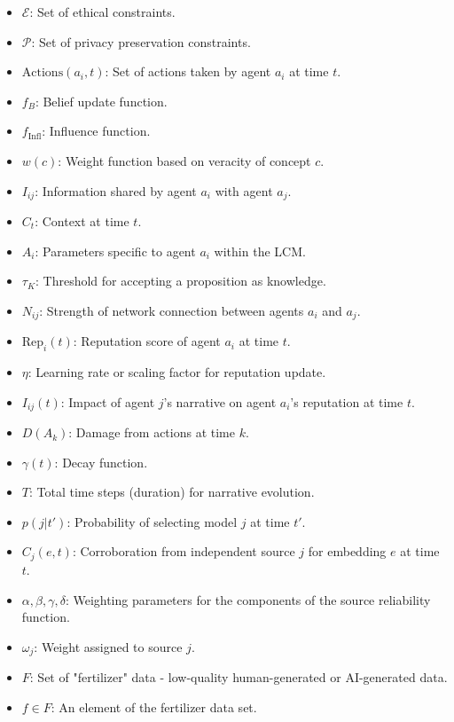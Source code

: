 \documentclass[12pt, a4paper]{article}
\begin{document}
\begin{itemize}
    \item \( \mathcal{E} \): Set of ethical constraints.
    \item \( \mathcal{P} \): Set of privacy preservation constraints.
    \item \( \text{Actions}(a_i, t) \): Set of actions taken by agent \( a_i \) at time \( t \).
    \item \( f_B \): Belief update function.
    \item \( f_{\text{Infl}} \): Influence function.
    \item \( w(c) \): Weight function based on veracity of concept \( c \).
    \item \( I_{ij} \): Information shared by agent \( a_i \) with agent \( a_j \).
    \item \( C_t \): Context at time \( t \).
    \item \( A_i \): Parameters specific to agent \( a_i \) within the LCM.
    \item \( \tau_K \): Threshold for accepting a proposition as knowledge.
    \item \( N_{ij} \): Strength of network connection between agents \( a_i \) and \( a_j \).
    \item \( \text{Rep}_i(t) \): Reputation score of agent \( a_i \) at time \( t \).
    \item \( \eta \): Learning rate or scaling factor for reputation update.
    \item \( I_{ij}(t) \): Impact of agent \( j \)'s narrative on agent \( a_i \)'s reputation at time \( t \).
    \item \( D(A_k) \): Damage from actions at time \( k \).
    \item \( \gamma(t) \): Decay function.
    \item \( T \):  Total time steps (duration) for narrative evolution.
    \item \( p(j|t') \): Probability of selecting model \( j \) at time \( t' \).
    \item \( C_j(e,t) \): Corroboration from independent source \(j\) for embedding \(e\) at time \(t\).
    \item \( \alpha, \beta, \gamma, \delta \): Weighting parameters for the components of the source reliability function.
    \item \( \omega_j \): Weight assigned to source \( j \).
    \item \( F \): Set of "fertilizer" data - low-quality human-generated or AI-generated data.
    \item \( f \in F \): An element of the fertilizer data set.

\end{itemize}
\end{document}
